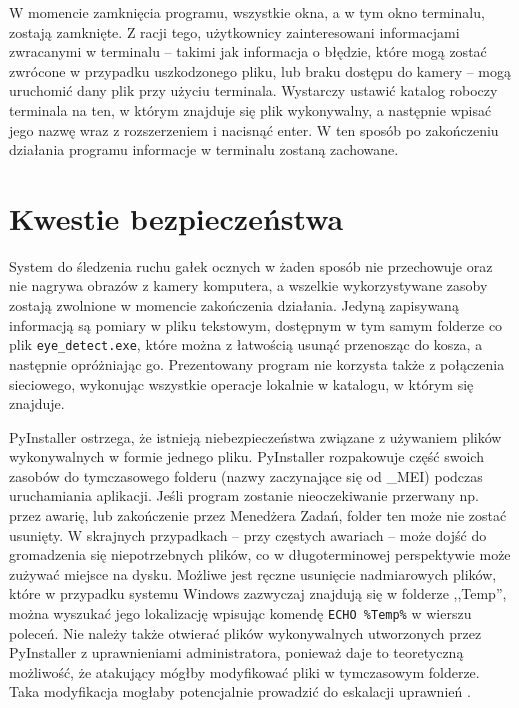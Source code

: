 \documentclass[a4paper,twoside,12pt]{book}
\begin{document}
W momencie zamknięcia programu, wszystkie okna, a w tym okno terminalu, zostają zamknięte. Z racji tego, użytkownicy zainteresowani informacjami zwracanymi w terminalu -- takimi jak informacja o błędzie, które mogą zostać zwrócone w przypadku uszkodzonego pliku, lub braku dostępu do kamery -- mogą uruchomić dany plik przy użyciu terminala. Wystarczy ustawić katalog roboczy terminala na ten, w którym znajduje się plik wykonywalny, a następnie wpisać jego nazwę wraz z rozszerzeniem i nacisnąć enter. W ten sposób po zakończeniu działania programu informacje w terminalu zostaną zachowane.

\section{Kwestie bezpieczeństwa}
\label{sec:Kwestie-bezpieczenstwa}

System do śledzenia ruchu gałek ocznych w żaden sposób nie przechowuje oraz nie nagrywa obrazów z kamery komputera, a wszelkie wykorzystywane zasoby zostają zwolnione w momencie zakończenia działania. Jedyną zapisywaną informacją są pomiary w pliku tekstowym, dostępnym w tym samym folderze co plik \texttt{eye\_\-detect.exe}, które można z łatwością usunąć przenosząc do kosza, a następnie opróżniając go. Prezentowany program nie korzysta także z połączenia sieciowego, wykonując wszystkie operacje lokalnie w katalogu, w którym się znajduje. 

PyInstaller ostrzega, że istnieją niebezpieczeństwa związane z używaniem plików wykonywalnych w formie jednego pliku. PyInstaller rozpakowuje część swoich zasobów do tymczasowego folderu (nazwy zaczynające się od \_MEI) podczas uruchamiania aplikacji. Jeśli program zostanie nieoczekiwanie przerwany np. przez awarię, lub zakończenie przez Menedżera Zadań, folder ten może nie zostać usunięty. W skrajnych przypadkach -- przy częstych awariach -- może dojść do gromadzenia się niepotrzebnych plików, co w długoterminowej perspektywie może zużywać miejsce na dysku. Możliwe jest ręczne usunięcie nadmiarowych plików, które w przypadku systemu Windows zazwyczaj znajdują się w folderze ,,Temp'', można wyszukać jego lokalizację wpisując komendę \texttt{ECHO \-\%Temp\%} w wierszu poleceń. Nie należy także otwierać plików wykonywalnych utworzonych przez PyInstaller z uprawnieniami administratora, ponieważ daje to teoretyczną możliwość, że atakujący mógłby modyfikować pliki w tymczasowym folderze. Taka modyfikacja mogłaby potencjalnie prowadzić do eskalacji uprawnień \cite{bib:PyInstaller-how-it-works}.
\end{document}
